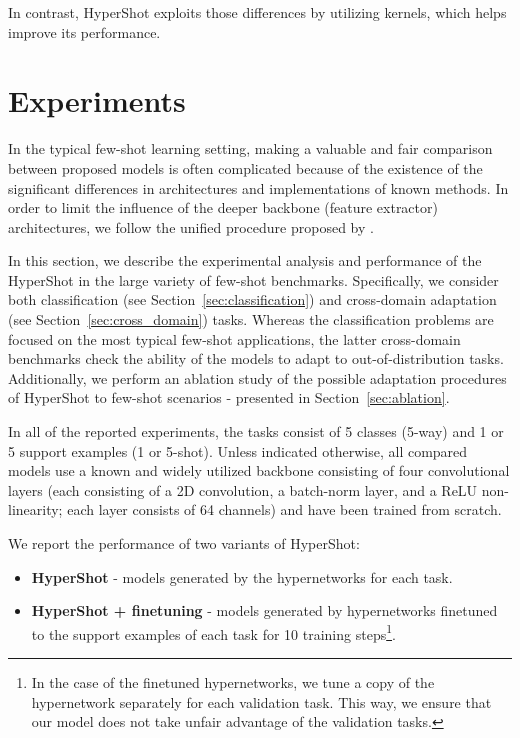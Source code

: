 \documentclass[nohyperref]{article}
\def\our{HyperShot}
\theoremstyle{plain}
\theoremstyle{definition}
\theoremstyle{remark}
\begin{document}
In contrast, \our{} exploits those differences by utilizing kernels, which helps improve its performance.






\section{Experiments}




In the typical few-shot learning setting, making a valuable and fair comparison between proposed models is often complicated because of the existence of the significant differences in architectures and implementations of known methods. In order to limit the influence of the deeper backbone (feature extractor) architectures, we follow the unified procedure proposed by \cite{chen2019closer}.

In this section, we describe the experimental analysis and performance of the \our{} in the large variety of few-shot benchmarks. Specifically, we consider both classification (see Section~\ref{sec:classification}) and cross-domain adaptation (see Section~\ref{sec:cross_domain}) tasks. Whereas the classification problems are focused on the most typical few-shot applications, the latter cross-domain benchmarks check the ability of the models to adapt to out-of-distribution tasks.
Additionally, we perform an ablation study of the possible adaptation procedures of \our{} to few-shot scenarios - presented in Section~\ref{sec:ablation}.

In all of the reported experiments, the tasks consist of 5 classes (5-way) and 1 or 5 support examples (1 or 5-shot). Unless indicated otherwise, all compared models use a known and widely utilized backbone consisting of four convolutional layers (each consisting of a 2D convolution, a batch-norm layer, and a ReLU non-linearity; each layer consists of 64 channels) and have been trained from scratch.

We report the performance of two variants of \our{}:
\begin{itemize}
    \item \textbf{\our{}} - models generated by the hypernetworks for each task.
    
    \item \textbf{\our{} + finetuning} - models generated by hypernetworks finetuned to the support examples of each task for 10 training steps\footnote{In the case of the finetuned hypernetworks, we tune a copy of the hypernetwork separately for each validation task. This way, we ensure that our model does not take unfair advantage of the validation tasks.}. 
\end{itemize}
\end{document}
